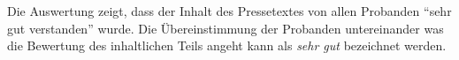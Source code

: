 Die Auswertung zeigt, dass der Inhalt des Pressetextes von allen Probanden
\enquote{sehr gut verstanden} wurde. Die Übereinstimmung der Probanden
untereinander was die Bewertung des inhaltlichen Teils angeht kann als
\emph{sehr gut} bezeichnet werden.








